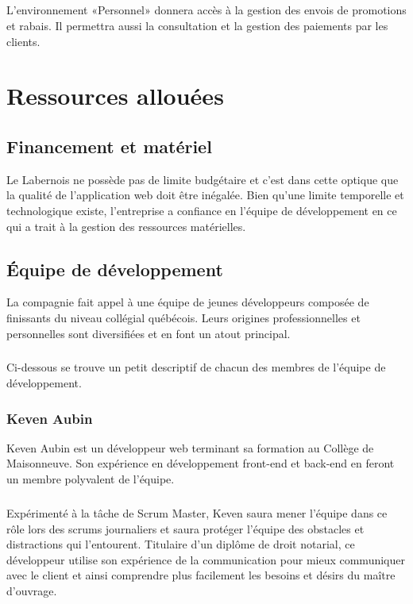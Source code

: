 \documentclass{scrreprt}
\def\projectname{Le Labernois}
\begin{document}
\paragraph{}
L'environnement «Personnel» donnera accès à la gestion des envois de
promotions et rabais. Il permettra aussi la consultation et la gestion
des paiements par les clients.

\chapter{Ressources allouées}
\section{Financement et matériel}

\projectname{} ne possède pas de limite budgétaire et c'est dans cette
optique que la qualité de l'application web doit être inégalée. Bien
qu'une limite temporelle et technologique existe, l'entreprise a
confiance en l'équipe de développement en ce qui a trait à la gestion
des ressources matérielles.

\section{Équipe de développement}

La compagnie fait appel à une équipe de jeunes développeurs composée de
finissants du niveau collégial québécois. Leurs origines
professionnelles et personnelles sont diversifiées et en font un atout
principal.

\paragraph{}
Ci-dessous se trouve un petit descriptif de chacun des membres de
l'équipe de développement.

\subsection{Keven Aubin}

Keven Aubin est un développeur web terminant sa formation au Collège de
Maisonneuve. Son expérience en développement front-end et back-end en
feront un membre polyvalent de l'équipe.

\paragraph{}
Expérimenté à la tâche de Scrum Master, Keven saura mener l'équipe dans
ce rôle lors des scrums journaliers et saura protéger l'équipe des
obstacles et distractions qui l'entourent.
Titulaire d'un diplôme de droit notarial, ce développeur utilise son
expérience de la communication pour mieux communiquer avec le client et
ainsi comprendre plus facilement les besoins et désirs du maître
d'ouvrage.
\end{document}
